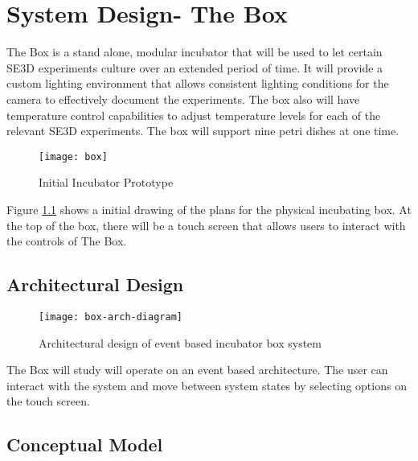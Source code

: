 \chapter{System Design- The Box}

The Box is a stand alone, modular incubator that will be used to let certain SE3D experiments culture over an extended period of time. It will provide a custom lighting environment that allows consistent lighting conditions for the camera to effectively document the experiments. The box also will have temperature control capabilities to adjust temperature levels for each of the relevant SE3D experiments. The box will support nine petri dishes at one time.

\begin{figure}[H]
\texttt{[image: box]}
\caption{\label{figure:box} Initial Incubator Prototype}
\end{figure}

Figure \ref{figure:box} shows a initial drawing of the plans for the physical incubating box. At the top of the box, there will be a touch screen that allows users to interact with the controls of The Box.



\section{Architectural Design}


\begin{figure}[H]
\texttt{[image: box-arch-diagram]}
\caption{\label{figure:box-arch} Architectural design of event based incubator box system}
\end{figure}

The Box will  study will operate on an event based architecture. The user can interact with the system and move between system states by selecting options on the touch screen.



\section{Conceptual Model}


